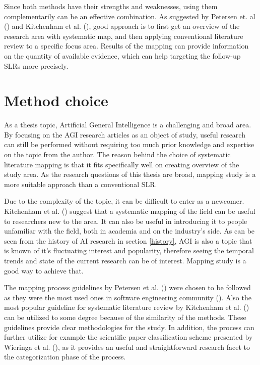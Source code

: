 \documentclass[utf8,english]{gradu3}
\begin{document}
Since both methods have their strengths and weaknesses, using them
complementarily can be an effective combination. As suggested by Petersen et. al
(\cite*{petersen2008}) and Kitchenham et al. (\cite{kitchenham2010}), good
approach is to first get an overview of the research area with systematic map,
and then applying conventional literature review to a specific focus area.
Results of the mapping can provide information on the quantity of available
evidence, which can help targeting the follow-up SLRs more precisely.


\section{Method choice}

As a thesis topic, Artificial General Intelligence is a challenging and broad
area. By focusing on the AGI research articles as an object of study, useful
research can still be performed without requiring too much prior knowledge and
expertise on the topic from the author. The reason behind the choice of
systematic literature mapping is that it fits specifically well on creating
overview of the study area. As the research questions of this thesis are broad,
mapping study is a more suitable approach than a conventional SLR.

Due to the complexity of the topic, it can be difficult to enter as a newcomer.
Kitchenham et al. (\cite*{kitchenham2010}) suggest that a systematic mapping of
the field can be useful to researchers new to the area.  It can also be useful
in introducing it to people unfamiliar with the field, both in academia and on
the industry's side. As can be seen from the history of AI research in section
\ref{history}, AGI is also a topic that is known of it's fluctuating interest
and popularity, therefore seeing the temporal trends and state of the current
research can be of interest. Mapping study is a good way to achieve that.

The mapping process guidelines by Petersen et al.
(\cite*{petersen2008,petersen2015}) were chosen to be followed as they were the
most used ones in software engineering community (\cite{petersen2015}). Also the
most popular guideline for systematic literature review by Kitchenham et al.
(\cite*{kitchenham2007}) can be utilized to some degree because of the similarity
of the methods. These guidelines provide clear methodologies for the study. In
addition, the process can further utilize for example the scientific paper
classification scheme presented by Wieringa et al. (\cite{wieringa2006}), as it
provides an useful and straightforward research facet to the categorization
phase of the process.
\end{document}
